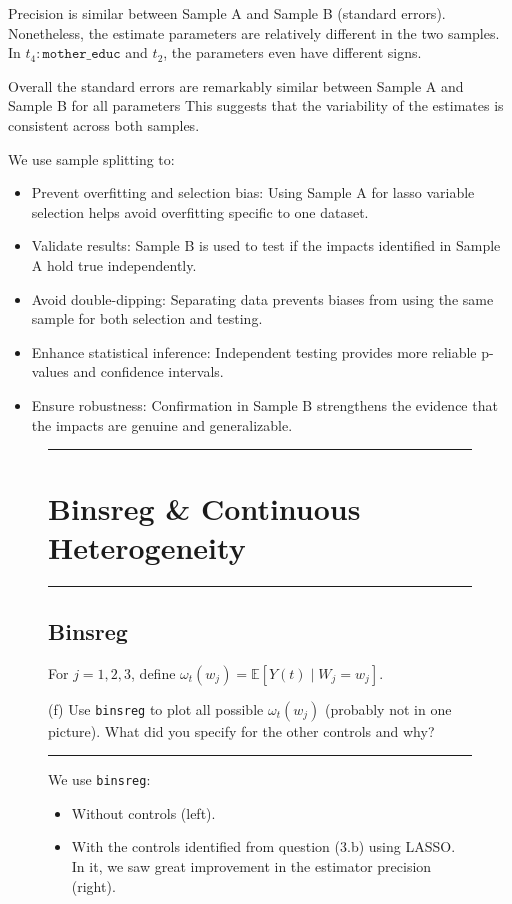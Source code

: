 \documentclass{article}
\newenvironment{colorparagraph}[1]{\par\color{#1}}{\par}
\begin{document}
Precision is similar between Sample A and Sample B (standard errors). Nonetheless, the estimate parameters are relatively different in the two samples. In $t_4:\texttt{mother\_educ}$ and $t_2$, the parameters even have different signs.

Overall the standard errors are remarkably similar between Sample A and Sample B for all parameters This suggests that the variability of the estimates is consistent across both samples.

We use sample splitting to:
\begin{itemize}
  \item Prevent overfitting and selection bias: Using Sample A for lasso variable selection helps avoid overfitting specific to one dataset.
  \item Validate results: Sample B is used to test if the impacts identified in Sample A hold true independently.
  \item Avoid double-dipping: Separating data prevents biases from using the same sample for both selection and testing.
  \item Enhance statistical inference: Independent testing provides more reliable p-values and confidence intervals.
  \item Ensure robustness: Confirmation in Sample B strengthens the evidence that the impacts are genuine and generalizable.
\end{itemize}



\begin{figure}[H]
\begin{colorparagraph}{questioncolor}
\rule{\textwidth}{0.5pt}

\section*{Binsreg \& Continuous Heterogeneity}
\label{q3f}
\rule{\textwidth}{0.5pt}
\subsection{Binsreg}
For \( j = 1, 2, 3 \), define \( \omega_t(w_j) = \mathbb{E}[Y(t) \mid W_j = w_j] \).

(f) Use \texttt{binsreg} to plot all possible \( \omega_t(w_j) \) (probably not in one picture). What did you specify for the other controls and why?

\rule{\textwidth}{0.5pt}
\end{colorparagraph}

We use \texttt{binsreg}:
\begin{itemize}
  \item Without controls (left).
  \item With the controls identified from question (3.b) using LASSO. In it, we saw great improvement in the estimator precision (right).
\end{itemize}
\end{figure}
\end{document}
